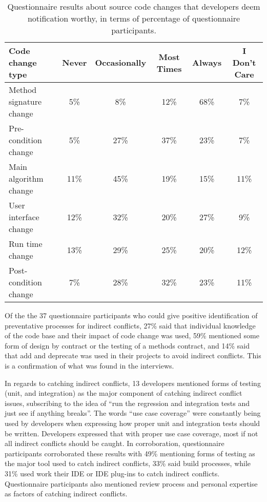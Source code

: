 \documentclass[conference]{IEEEtran}
\begin{document}
\begin{table*}[tb!]
\begin{center}
\begin{tabular}{| p{7cm} | c | c | c | c | c |}
\hline
Code change type &Never  & Occasionally & Most Times & Always & I Don't Care \\
\hline
\hline
Method signature change & 5\% & 8\% & 12\% & 68\% & 7\% \\ \hline
Pre-condition change & 5\% & 27\% & 37\% & 23\% & 7\% \\ \hline
Main algorithm change & 11\% & 45\% & 19\% & 15\% & 11\% \\ \hline
User interface change & 12\% & 32\% & 20\% & 27\% & 9\% \\ \hline
Run time change & 13\% & 29\% & 25\% & 20\% & 12\% \\ \hline
Post-condition change & 7\% & 28\% & 32\% & 23\% & 11\% \\ \hline
\end{tabular}
\end{center}
\caption{Questionnaire results about source code changes that developers deem notification worthy, in terms of percentage
of questionnaire participants.\label{tab:pre}}
\end{table*}

Of the the 37 questionnaire participants who could give positive identification of preventative processes for indirect conflicts,
27\% said that individual knowledge of the code base and their impact of code change was used, 59\% mentioned some form of design
by contract or the testing of a methods contract, and 14\% said that add and
deprecate was used in their projects to avoid indirect conflicts. This is a confirmation of what was found in the interviews.

In regards to catching indirect conflicts, 13 developers mentioned forms of testing (unit, and integration)
as the major component of catching indirect conflict issues, subscribing to the idea of ``run the regression and integration
tests and just see if anything breaks''. The words ``use case coverage'' were constantly being used by developers
when expressing how proper unit and integration tests should be written. Developers expressed that with proper use case coverage, most if
not all indirect conflicts should be caught. In corroboration, 
questionnaire participants corroborated these results with 49\% mentioning forms of testing as the major tool used to
catch indirect conflicts, 33\% said build processes, while 31\% used work their IDE or IDE plug-ins to catch indirect conflicts.
Questionnaire participants also mentioned review process and personal expertise as factors of catching indirect conflicts.
\end{document}
